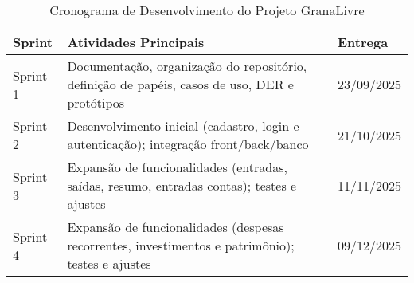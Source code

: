 \begin{table}[h!]
\centering
\caption{Cronograma de Desenvolvimento do Projeto GranaLivre}
\label{tab:cronograma}
\renewcommand{\arraystretch}{1.3}
\begin{tabular}{@{}p{3.2cm} p{7cm} p{2.5cm}@{}}
\toprule
\textbf{Sprint} & \textbf{Atividades Principais} & \textbf{Entrega} \\
\midrule
Sprint 1 & Documentação, organização do repositório, definição de papéis, casos de uso, DER e protótipos & 23/09/2025 \\
Sprint 2 & Desenvolvimento inicial (cadastro, login e autenticação); integração front/back/banco & 21/10/2025 \\
Sprint 3 & Expansão de funcionalidades (entradas, saídas, resumo, entradas contas); testes e ajustes & 11/11/2025 \\
Sprint 4 & Expansão de funcionalidades (despesas recorrentes, investimentos e patrimônio); testes e ajustes & 09/12/2025 \\
\bottomrule
\end{tabular}
\end{table}